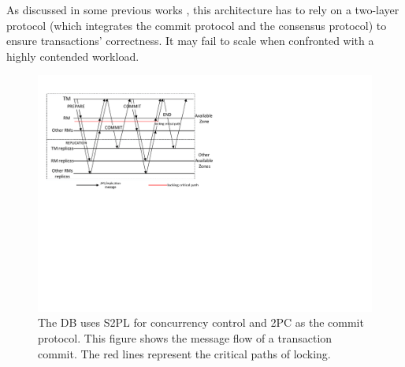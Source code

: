 \documentclass[conference]{IEEEtran}
\begin{document}
As discussed in some previous works \cite{Calvin:conf/sigmod/ThomsonDWRSA12}\cite{Tapir:conf/sosp/ZhangSSKP15}\cite{Janus:conf/osdi/MuNLL16},
this architecture has to rely on a two-layer protocol (which integrates the commit protocol and the consensus protocol) to ensure transactions' correctness.
It may fail to scale when confronted with a highly contended workload.


\begin{figure}[tbp]
  \centerline{\includegraphics[scale=0.50]{figure/message_flow.pdf}}
  \caption
  {
The DB uses S2PL for concurrency control and 2PC as the commit protocol.
This figure shows the message flow of a transaction commit.
The red lines represent the critical paths of locking.
    }
\label{fig:message_flow}
\end{figure}
\end{document}
